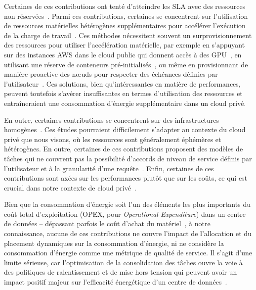 Certaines de ces contributions ont tenté d'atteindre les \gls{SLA} avec des ressources non réservées~\cite{gujaratiSwayamDistributedAutoscaling2017, zhangMArkExploitingCloud, mampageDeadlineawareDynamicResource2021, singhviAtollScalableLowLatency2021, handaoui2020releaser, handaoui2020salamander, yalles2022riscless}. Parmi ces contributions, certaines se concentrent sur l'utilisation de ressources matérielles hétérogènes supplémentaires pour accélérer l'exécution de la charge de travail~\cite{zhangMArkExploitingCloud, lingPigeonDynamicEfficient2019, yangINFlessNativeServerless2022}. Ces méthodes nécessitent souvent un surprovisionnement des ressources pour utiliser l'accélération matérielle, par exemple en s'appuyant sur des instances \gls{AWS} dans le cloud public qui donnent accès à des \gls{GPU}~\cite{zhangMArkExploitingCloud}, en utilisant une réserve de conteneurs pré-initialisés~\cite{lingPigeonDynamicEfficient2019}, ou même en provisionnant de manière proactive des nœuds pour respecter des échéances définies par l'utilisateur~\cite{singhviAtollScalableLowLatency2021}. Ces solutions, bien qu'intéressantes en matière de performances, peuvent toutefois s'avérer insuffisantes en termes d'utilisation des ressources et entraîneraient une consommation d'énergie supplémentaire dans un cloud privé.

En outre, certaines contributions se concentrent sur des infrastructures homogènes~\cite{gujaratiSwayamDistributedAutoscaling2017, sureshENSUREEfficientScheduling2020, mampageDeadlineawareDynamicResource2021, singhviAtollScalableLowLatency2021, yangINFlessNativeServerless2022}. Ces études pourraient difficilement s'adapter au contexte du cloud privé que nous visons, où les ressources sont généralement éphémères et hétérogènes. En outre, certaines de ces contributions proposent des modèles de tâches qui ne couvrent pas la possibilité d'accords de niveau de service définis par l'utilisateur et à la granularité d'une requête~\cite{sureshENSUREEfficientScheduling2020, lingPigeonDynamicEfficient2019}. Enfin, certaines de ces contributions sont axées sur les performances plutôt que sur les coûts, ce qui est crucial dans notre contexte de cloud privé~\cite{gujaratiSwayamDistributedAutoscaling2017, lingPigeonDynamicEfficient2019, singhviAtollScalableLowLatency2021, choSLADrivenMLInference}.

Bien que la consommation d'énergie soit l'un des éléments les plus importants du coût total d'exploitation (\gls{OPEX}, pour \textit{Operational Expenditure}) dans un centre de données -- dépassant parfois le coût d'achat du matériel~\cite{7279063}, à notre connaissance, aucune de ces contributions ne couvre l'impact de l'allocation et du placement dynamiques sur la consommation d'énergie, ni ne considère la consommation d'énergie comme une métrique de qualité de service. Il s'agit d'une limite sérieuse, car l'optimisation de la consolidation des tâches ouvre la voie à des politiques de ralentissement et de mise hors tension qui peuvent avoir un impact positif majeur sur l'efficacité énergétique d'un centre de données~\cite{chaurasiaComprehensiveSurveyEnergyaware2021}.

